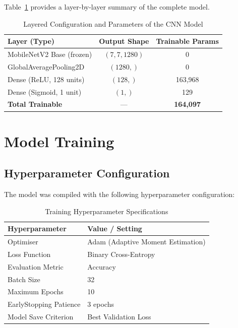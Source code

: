 \documentclass[12pt,a4paper]{report}
\begin{document}
Table~\ref{tab:model} provides a layer-by-layer summary of the complete model.

\begin{table}[H]
\centering
\caption{Layered Configuration and Parameters of the CNN Model}
\label{tab:model}
\begin{tabular}{lcc}
\toprule
\textbf{Layer (Type)}      & \textbf{Output Shape} & \textbf{Trainable Params} \\
\midrule
MobileNetV2 Base (frozen)  & $(7, 7, 1280)$        & 0                         \\
GlobalAveragePooling2D     & $(1280,)$             & 0                         \\
Dense (ReLU, 128 units)    & $(128,)$              & 163,968                   \\
Dense (Sigmoid, 1 unit)    & $(1,)$                & 129                       \\
\midrule
\textbf{Total Trainable}   & ---                   & \textbf{164,097}          \\
\bottomrule
\end{tabular}
\end{table}

\section{Model Training}

\subsection{Hyperparameter Configuration}

The model was compiled with the following hyperparameter configuration:

\begin{table}[H]
\centering
\caption{Training Hyperparameter Specifications}
\label{tab:hyperparams}
\begin{tabular}{ll}
\toprule
\textbf{Hyperparameter}   & \textbf{Value / Setting}          \\
\midrule
Optimiser                 & Adam (Adaptive Moment Estimation) \\
Loss Function             & Binary Cross-Entropy              \\
Evaluation Metric         & Accuracy                          \\
Batch Size                & 32                                \\
Maximum Epochs            & 10                                \\
EarlyStopping Patience    & 3 epochs                          \\
Model Save Criterion      & Best Validation Loss              \\
\bottomrule
\end{tabular}
\end{table}
\end{document}

